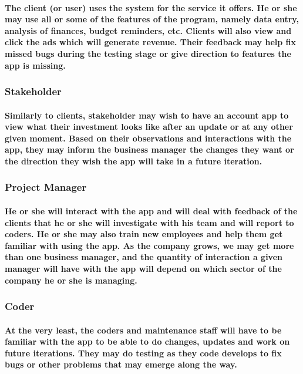 \documentclass{article}
\begin{document}
\paragraph{\indent The client (or user) uses the system for the service it offers. He or she may use all or some of the features of the program, namely data entry, analysis of finances, budget reminders, etc. Clients will also view and click the ads which will generate revenue. Their feedback may help fix missed bugs during the testing stage or give direction to features the app is missing.  }

\subsubsection{Stakeholder}
\paragraph{\indent Similarly to clients, stakeholder may wish to have an account app to view what their investment looks like after an update or at any other given moment. Based on their observations and interactions with the app, they may inform the business manager the changes they want or the direction they wish the app will take in a future iteration.}

\subsubsection{Project Manager}
\paragraph{\indent He or she will interact with the app and will deal with feedback of the clients that he or she will investigate with his team and will report to coders. He or she may also train new employees and help them get familiar with using the app. As the company grows, we may get more than one business manager, and the quantity of interaction a given manager will have with the app will depend on which sector of the company he or she is managing.}

\subsubsection{Coder}
\paragraph{\indent At the very least, the coders and maintenance staff will have to be familiar with the app to be able to do changes, updates and work on future iterations. They may do testing as they code develops to fix bugs or other problems that may emerge along the way.}
\end{document}
